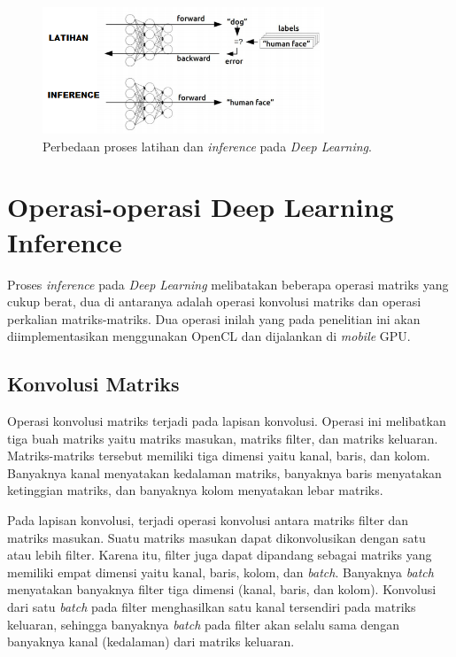 \begin{figure}
	\centering
	\includegraphics[width=0.75\textwidth]
	{pics/trainingvsinference.png}
	\caption{Perbedaan proses latihan dan \textit{inference} pada \textit{Deep Learning}.}
	\label{fig:trainvsinfer}
\end{figure}

\section{Operasi-operasi Deep Learning Inference}
Proses \textit{inference} pada \textit{Deep Learning} melibatakan beberapa operasi matriks yang cukup berat, dua di antaranya adalah operasi konvolusi matriks dan operasi perkalian matriks-matriks. Dua operasi inilah yang pada penelitian ini akan diimplementasikan menggunakan OpenCL dan dijalankan di \textit{mobile} GPU.

\subsection{Konvolusi Matriks}
Operasi konvolusi matriks terjadi pada lapisan konvolusi. Operasi ini melibatkan tiga buah matriks yaitu matriks masukan, matriks filter, dan matriks keluaran. Matriks-matriks tersebut memiliki tiga dimensi yaitu kanal, baris, dan kolom. Banyaknya kanal menyatakan kedalaman matriks, banyaknya baris menyatakan ketinggian matriks, dan banyaknya kolom menyatakan lebar matriks.

Pada lapisan konvolusi, terjadi operasi konvolusi antara matriks filter dan matriks masukan. Suatu matriks masukan dapat dikonvolusikan dengan satu atau lebih filter. Karena itu, filter juga dapat dipandang sebagai matriks yang memiliki empat dimensi yaitu kanal, baris, kolom, dan \textit{batch}. Banyaknya \textit{batch} menyatakan banyaknya filter tiga dimensi (kanal, baris, dan kolom). Konvolusi dari satu \textit{batch} pada filter menghasilkan satu kanal tersendiri pada matriks keluaran, sehingga banyaknya \textit{batch} pada filter akan selalu sama dengan banyaknya kanal (kedalaman) dari matriks keluaran.	

